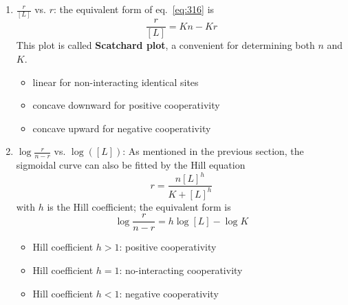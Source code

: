 \begin{enumerate}
\item $\frac{r}{[L]}$ vs. $r$: the equivalent form of
  eq.~\eqref{eq:316} is
  \begin{equation}
    \label{eq:318}
    \frac{r}{[L]} = Kn - Kr
  \end{equation}
This plot is called {\bf Scatchard plot}, a convenient for determining
both $n$ and $K$.
\begin{itemize}
\item linear for non-interacting identical sites
\item concave downward for positive cooperativity
\item concave upward for negative cooperativity
\end{itemize}

\item $\log\frac{r}{n-r}$ vs. $\log([L])$: As mentioned in the
  previous section, the sigmoidal curve can also be fitted by the Hill
  equation
  \begin{equation}
    \label{eq:319}
    r = \frac{n[L]^h}{K + [L]^h}
  \end{equation}
with $h$ is the Hill coefficient; the equivalent form is
\begin{equation}
  \label{eq:320}
  \log\frac{r}{n-r} =h\log[L] - \log K
\end{equation}
\begin{itemize}
\item Hill coefficient $h> 1$: positive cooperativity
\item Hill coefficient $h= 1$: no-interacting cooperativity
\item Hill coefficient $h< 1$: negative cooperativity
\end{itemize}
\end{enumerate}

